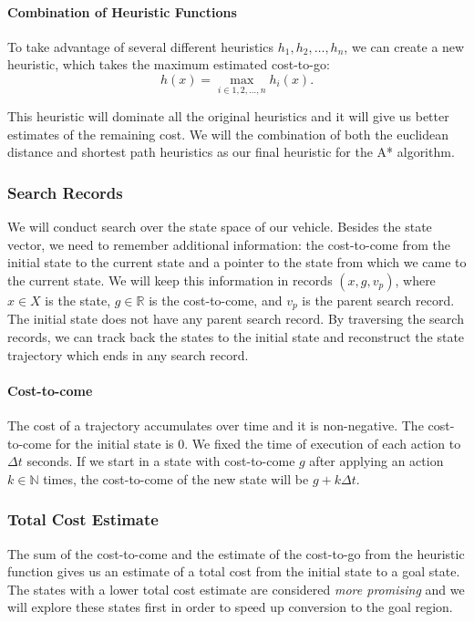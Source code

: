 \paragraph{Combination of Heuristic Functions}
To take advantage of several different heuristics $h_1,h_2,\ldots ,h_n$, we can create a new heuristic, which takes the maximum estimated cost-to-go:
\[
	h(x)=\max_{i \in {1, 2, \ldots, n}}h_i(x).
\]

This heuristic will dominate all the original heuristics and it will give us better estimates of the remaining cost. We will the combination of both the euclidean distance and shortest path heuristics as our final heuristic for the A* algorithm.

\subsubsection{Search Records}

We will conduct search over the state space of our vehicle. Besides the state vector, we need to remember additional information: the cost-to-come from the initial state to the current state and a pointer to the state from which we came to the current state. We will keep this information in records $\left(x, g, v_p\right)$, where $x\in X$ is the state, $g\in \mathbb{R}$ is the cost-to-come, and $v_p$ is the parent search record. The initial state does not have any parent search record. By traversing the search records, we can track back the states to the initial state and reconstruct the state trajectory which ends in any search record.

\paragraph{Cost-to-come} The cost of a trajectory accumulates over time and it is non-negative. The cost-to-come for the initial state is $0$. We fixed the time of execution of each action to $\Delta t$ seconds. If we start in a state with cost-to-come $g$ after applying an action $k\in \mathbb{N}$ times, the cost-to-come of the new state will be $g+k\Delta t$.

\subsubsection{Total Cost Estimate} The sum of the cost-to-come and the estimate of the cost-to-go from the heuristic function gives us an estimate of a total cost from the initial state to a goal state. The states with a lower total cost estimate are considered \textit{more promising} and we will explore these states first in order to speed up conversion to the goal region.

